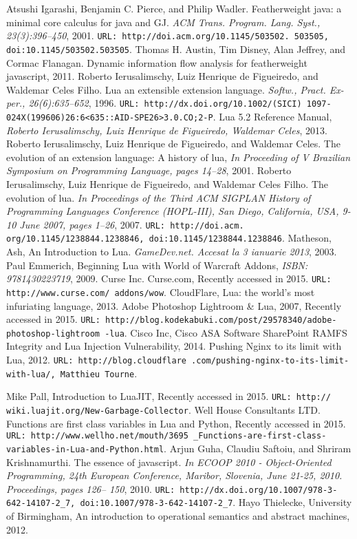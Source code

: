 \begin{thebibliography}{10}
\addtolength{\leftmargin}{0.2in} %
\setlength{\itemindent}{-0.2in}

 Atsushi Igarashi, Benjamin C. Pierce, and Philip Wadler. Featherweight java: a minimal core calculus for java and GJ. {\it ACM Trans. Program. Lang. Syst., 23(3):396–450}, 2001. {\tt URL: http://doi.acm.org/10.1145/503502. 503505, doi:10.1145/503502.503505}.
 Thomas H. Austin, Tim Disney, Alan Jeffrey, and Cormac Flanagan. Dynamic information flow analysis for featherweight javascript, 2011.
 Roberto Ierusalimschy, Luiz Henrique de Figueiredo, and Waldemar Celes Filho. Lua an extensible extension language. {\it Softw., Pract. Ex- per., 26(6):635–652}, 1996. {\tt URL: http://dx.doi.org/10.1002/(SICI) 1097-024X(199606)26:6<635::AID-SPE26>3.0.CO;2-P}.
 Lua 5.2 Reference Manual, {\it Roberto Ierusalimschy, Luiz Henrique de Figueiredo, Waldemar Celes}, 2013.
 Roberto Ierusalimschy, Luiz Henrique de Figueiredo, and Waldemar Celes. The evolution of an extension language: A history of lua, {\it In Proceeding of V Brazilian Symposium on Programming Language, pages 14–28}, 2001.
 Roberto Ierusalimschy, Luiz Henrique de Figueiredo, and Waldemar Celes Filho. The evolution of lua. {\it In Proceedings of the Third ACM SIGPLAN History of Programming Languages Conference (HOPL-III), San Diego, California, USA, 9-10 June 2007, pages 1–26}, 2007. {\tt URL: http://doi.acm. org/10.1145/1238844.1238846, doi:10.1145/1238844.1238846}.
 Matheson, Ash, An Introduction to Lua. {\it GameDev.net. Accesat la 3 ianuarie 2013}, 2003.
 Paul Emmerich, Beginning Lua with World of Warcraft Addons, {\it ISBN: 9781430223719}, 2009.
 Curse Inc. Curse.com, Recently accessed in 2015. {\tt URL: http://www.curse.com/
addons/wow}.
 CloudFlare, Lua: the world's most infuriating language, 2013.
 Adobe Photoshop Lightroom \& Lua, 2007, Recently accessed in 2015. {\tt URL: http://blog.kodekabuki.com/post/29578340/adobe-photoshop-lightroom
-lua}.
 Cisco Inc, Cisco ASA Software SharePoint RAMFS Integrity and Lua Injection Vulnerability, 2014.
 Pushing Nginx to its limit with Lua, 2012. {\tt URL: http://blog.cloudflare
.com/pushing-nginx-to-its-limit-with-lua/, Matthieu Tourne}.

 Mike Pall, Introduction to LuaJIT, Recently accessed in 2015. {\tt URL: http://
wiki.luajit.org/New-Garbage-Collector}.
 Well House Consultants LTD. Functions are first class variables in Lua and Python, Recently accessed in 2015. 
{\tt URL: http://www.wellho.net/mouth/3695
\_Functions-are-first-class-variables-in-Lua-and-Python.html}.
 Arjun Guha, Claudiu Saftoiu, and Shriram Krishnamurthi. The essence of javascript. {\it In ECOOP 2010 - Object-Oriented Programming, 24th European Conference, Maribor, Slovenia, June 21-25, 2010. Proceedings, pages 126– 150}, 2010. {\tt URL: http://dx.doi.org/10.1007/978-3-642-14107-2\_7, doi:10.1007/978-3-642-14107-2\_7}.
 Hayo Thielecke, University of Birmingham, An introduction to operational semantics and abstract machines, 2012.


\end{thebibliography}
